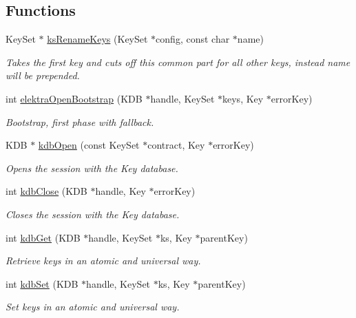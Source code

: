 \subsection*{Functions}
\begin{DoxyCompactItemize}
\item 
Key\+Set $\ast$ \hyperlink{group__kdb_ga1ba80a565f54490f362df95f401bcb29}{ks\+Rename\+Keys} (Key\+Set $\ast$config, const char $\ast$name)
\begin{DoxyCompactList}\small\item\em Takes the first key and cuts off this common part for all other keys, instead name will be prepended. \end{DoxyCompactList}\item 
\mbox{\label{group__kdb_ga5bfaad0230457cd6386032fe65c41576}} 
int \hyperlink{group__kdb_ga5bfaad0230457cd6386032fe65c41576}{elektra\+Open\+Bootstrap} (K\+DB $\ast$handle, Key\+Set $\ast$keys, Key $\ast$error\+Key)
\begin{DoxyCompactList}\small\item\em Bootstrap, first phase with fallback. \end{DoxyCompactList}\item 
K\+DB $\ast$ \hyperlink{group__kdb_ga844e1299a84c3fbf1d3a905c5c893ba5}{kdb\+Open} (const Key\+Set $\ast$contract, Key $\ast$error\+Key)
\begin{DoxyCompactList}\small\item\em Opens the session with the Key database. \end{DoxyCompactList}\item 
int \hyperlink{group__kdb_gadb54dc9fda17ee07deb9444df745c96f}{kdb\+Close} (K\+DB $\ast$handle, Key $\ast$error\+Key)
\begin{DoxyCompactList}\small\item\em Closes the session with the Key database. \end{DoxyCompactList}\item 
int \hyperlink{group__kdb_ga28e385fd9cb7ccfe0b2f1ed2f62453a1}{kdb\+Get} (K\+DB $\ast$handle, Key\+Set $\ast$ks, Key $\ast$parent\+Key)
\begin{DoxyCompactList}\small\item\em Retrieve keys in an atomic and universal way. \end{DoxyCompactList}\item 
int \hyperlink{group__kdb_ga11436b058408f83d303ca5e996832bcf}{kdb\+Set} (K\+DB $\ast$handle, Key\+Set $\ast$ks, Key $\ast$parent\+Key)
\begin{DoxyCompactList}\small\item\em Set keys in an atomic and universal way. \end{DoxyCompactList}\end{DoxyCompactItemize}


